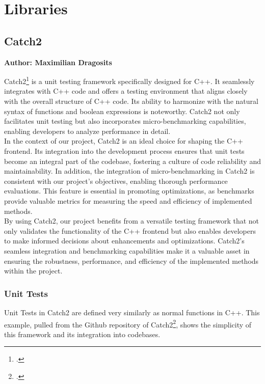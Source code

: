 \section{Libraries}

\subsection{Catch2}
\textbf{Author: Maximilian Dragosits}

Catch2\footcite{catch2_git} is a unit testing framework specifically designed for C++. It seamlessly integrates with C++ code and offers a testing environment 
that aligns closely with the overall structure of C++ code. Its ability to harmonize with the natural syntax of functions and boolean expressions is noteworthy. 
Catch2 not only facilitates unit testing but also incorporates micro-benchmarking capabilities, enabling developers to analyze performance in detail.\\

In the context of our project, Catch2 is an ideal choice for shaping the C++ frontend. Its integration into the development process ensures that unit tests 
become an integral part of the codebase, fostering a culture of code reliability and maintainability. In addition, the integration of micro-benchmarking in Catch2 
is consistent with our project's objectives, enabling thorough performance evaluations. This feature is essential in promoting optimizations, as benchmarks provide 
valuable metrics for measuring the speed and efficiency of implemented methods.\\

By using Catch2, our project benefits from a versatile testing framework that not only validates the functionality of the C++ frontend but also enables developers 
to make informed decisions about enhancements and optimizations. Catch2's seamless integration and benchmarking capabilities make it a valuable asset in ensuring 
the robustness, performance, and efficiency of the implemented methods within the project.\\

\subsubsection{Unit Tests}

Unit Tests in Catch2 are defined very similarly as normal functions in C++. This example, pulled from the Github repository of Catch2\footcite{catch2_git}, shows the simplicity of
this framework and its integration into codebases.

